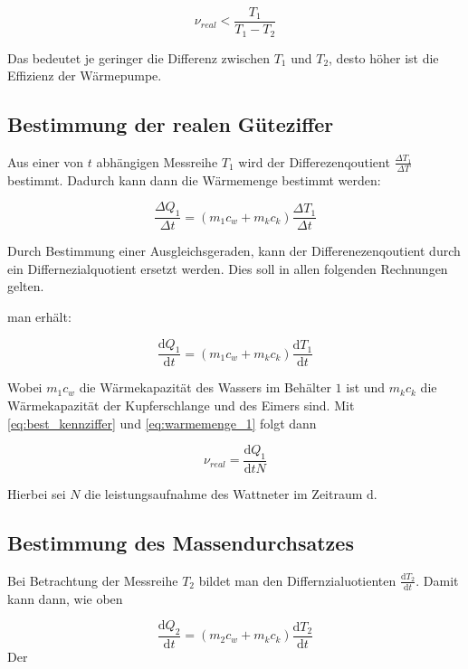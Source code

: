 \begin{equation*}
\nu_{real}<\frac{T_1}{T_1-T_2}
\end{equation*}

Das bedeutet je geringer die Differenz zwischen $T_1$ und $T_2$, 
desto höher ist die Effizienz der Wärmepumpe.

\subsection{Bestimmung der realen Güteziffer}
Aus einer von $t$ abhängigen Messreihe $T_1$ wird der Differezenqoutient $\frac{\Delta T_1}{\Delta T}$ bestimmt.
Dadurch kann dann die Wärmemenge bestimmt werden:

\begin{equation*}
\frac{\Delta Q_1}{\Delta t}=\left(m_1c_w+m_kc_k\right)\frac{\Delta T_1}{\Delta t}
\end{equation*}

Durch Bestimmung einer Ausgleichsgeraden, kann der 
Differenezenqoutient durch ein Differnezialquotient
ersetzt werden.
Dies soll in allen folgenden Rechnungen gelten.

man erhält:

\begin{equation}
\label{eq:warmemenge_1}
\frac{\mathup{d} Q_1}{\mathup{d} t}=\left(m_1c_w+m_kc_k\right)\frac{\mathup{d} T_1}{\mathup{d} t}
\end{equation}


Wobei $m_1c_w$ die Wärmekapazität des Wassers im Behälter $1$ ist und 
$m_kc_k$ die Wärmekapazität der Kupferschlange und des Eimers sind.
Mit \eqref{eq:best_kennziffer} und \eqref{eq:warmemenge_1} folgt dann

\begin{equation}
\label{eq:bestimmung_ziffer}
\nu_{real}=\frac{\mathup{d}Q_1}{\mathup{d}tN}
\end{equation}

Hierbei sei $N$ die leistungsaufnahme des Wattneter im Zeitraum $\mathup{d}$.

\subsection{Bestimmung des Massendurchsatzes}

Bei Betrachtung der Messreihe $T_2$ bildet man den Differnzialuotienten $\frac{\mathup{d}T_2}{\mathup{d}t}$.
Damit kann dann, wie oben

\begin{equation*}
\frac{\mathup{d} Q_2}{\mathup{d} t}=\left(m_2c_w+m_kc_k\right)\frac{\mathup{d} T_2}{\mathup{d} t}
\end{equation*}Der

